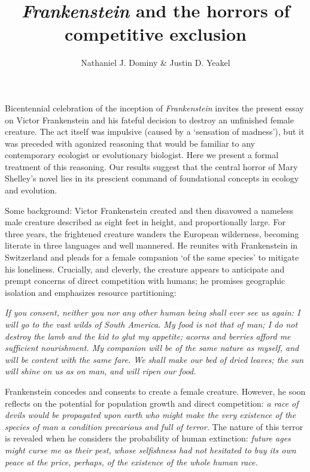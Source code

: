 \documentclass{article}[10pt]
\begin{document}
\title{\emph{Frankenstein} and the horrors of competitive exclusion}


\author{Nathaniel J. Dominy \& Justin D. Yeakel}

\date{}
%
%


\maketitle
\vspace{-1.5cm}
Bicentennial celebration of the inception of \textit{Frankenstein} invites the present essay on Victor Frankenstein and his fateful decision to destroy an unfinished female creature. 
The act itself was impulsive (caused by a `sensation of madness'), but it was preceded with agonized reasoning that would be familiar to any contemporary ecologist or evolutionary biologist. 
Here we present a formal treatment of this reasoning. 
Our results suggest that the central horror of Mary Shelley's novel lies in its prescient command of foundational concepts in ecology and evolution.



Some background: Victor Frankenstein created and then disavowed a nameless male creature described as eight feet in height, and proportionally large. 
For three years, the frightened creature wanders the European wilderness, becoming literate in three languages and well mannered. 
He reunites with Frankenstein in Switzerland and pleads for a female companion `of the same species' to mitigate his loneliness. Crucially, and cleverly, the creature appears to anticipate and prempt concerns of direct competition with humans; he promises geographic isolation and emphasizes resource partitioning:


\begin{displayquote}
\emph{If you consent, neither you nor any other human being shall ever see us again: I will go to the vast wilds of South America. My food is not that of man; I do not destroy the lamb and the kid to glut my appetite; acorns and berries afford me sufficient nourishment. My companion will be of the same nature as myself, and will be content with the same fare. We shall make our bed of dried leaves; the sun will shine on us as on man, and will ripen our food.}
\end{displayquote}

Frankenstein concedes and consents to create a female creature. 
However, he soon reflects on the potential for population growth and direct competition: \emph{a race of devils would be propagated upon earth who might make the very existence of the species of man a condition precarious and full of terror.}
The nature of this terror is revealed when he considers the probability of human extinction: \emph{future ages might curse me as their pest, whose selfishness had not hesitated to buy its own peace at the price, perhaps, of the existence of the whole human race.}
\end{document}
